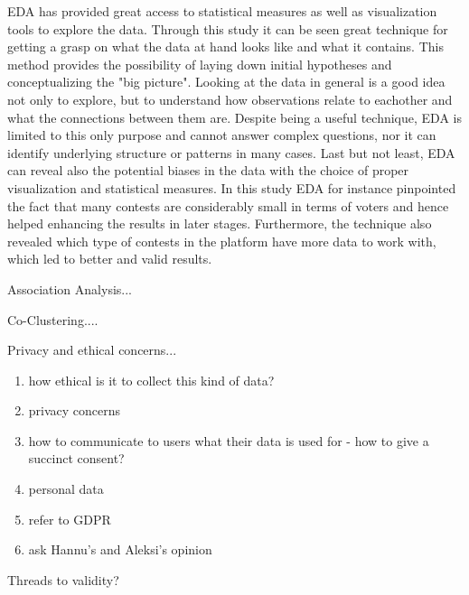 EDA has provided great access to statistical measures as well as visualization tools to explore the data. Through this study it can be seen great technique for getting a grasp on what the data at hand looks like and what it contains. This method provides the possibility of laying down initial hypotheses and conceptualizing the "big picture". Looking at the data in general is a good idea not only to explore, but to understand how observations relate to eachother and what the connections between them are. Despite being a useful technique, EDA is limited to this only purpose and cannot answer complex questions, nor it can identify underlying structure or patterns in many cases. Last but not least, EDA can reveal also the potential biases in the data with the choice of proper visualization and statistical measures. In this study EDA for instance pinpointed the fact that many contests are considerably small in terms of voters and hence helped enhancing the results in later stages. Furthermore, the technique also revealed which type of contests in the platform have more data to work with, which led to better and valid results. 

Association Analysis... %

Co-Clustering.... %

Privacy and ethical concerns...

\begin{enumerate}
    \item how ethical is it to collect this kind of data?
    \item privacy concerns
    \item how to communicate to users what their data is used for - how to give a succinct consent?
    \item personal data
    \item refer to GDPR 
    \item ask Hannu's and Aleksi's opinion
\end{enumerate}

Threads to validity? 
